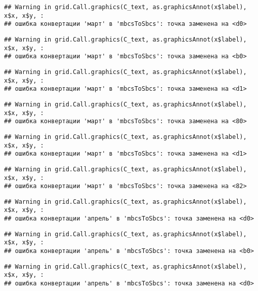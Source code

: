 \documentclass[
]{article}
\begin{document}
\begin{verbatim}
## Warning in grid.Call.graphics(C_text, as.graphicsAnnot(x$label), x$x, x$y, :
## ошибка конвертации 'март' в 'mbcsToSbcs': точка заменена на <d0>
\end{verbatim}

\begin{verbatim}
## Warning in grid.Call.graphics(C_text, as.graphicsAnnot(x$label), x$x, x$y, :
## ошибка конвертации 'март' в 'mbcsToSbcs': точка заменена на <b0>
\end{verbatim}

\begin{verbatim}
## Warning in grid.Call.graphics(C_text, as.graphicsAnnot(x$label), x$x, x$y, :
## ошибка конвертации 'март' в 'mbcsToSbcs': точка заменена на <d1>
\end{verbatim}

\begin{verbatim}
## Warning in grid.Call.graphics(C_text, as.graphicsAnnot(x$label), x$x, x$y, :
## ошибка конвертации 'март' в 'mbcsToSbcs': точка заменена на <80>
\end{verbatim}

\begin{verbatim}
## Warning in grid.Call.graphics(C_text, as.graphicsAnnot(x$label), x$x, x$y, :
## ошибка конвертации 'март' в 'mbcsToSbcs': точка заменена на <d1>
\end{verbatim}

\begin{verbatim}
## Warning in grid.Call.graphics(C_text, as.graphicsAnnot(x$label), x$x, x$y, :
## ошибка конвертации 'март' в 'mbcsToSbcs': точка заменена на <82>
\end{verbatim}

\begin{verbatim}
## Warning in grid.Call.graphics(C_text, as.graphicsAnnot(x$label), x$x, x$y, :
## ошибка конвертации 'апрель' в 'mbcsToSbcs': точка заменена на <d0>
\end{verbatim}

\begin{verbatim}
## Warning in grid.Call.graphics(C_text, as.graphicsAnnot(x$label), x$x, x$y, :
## ошибка конвертации 'апрель' в 'mbcsToSbcs': точка заменена на <b0>
\end{verbatim}

\begin{verbatim}
## Warning in grid.Call.graphics(C_text, as.graphicsAnnot(x$label), x$x, x$y, :
## ошибка конвертации 'апрель' в 'mbcsToSbcs': точка заменена на <d0>
\end{verbatim}
\end{document}

